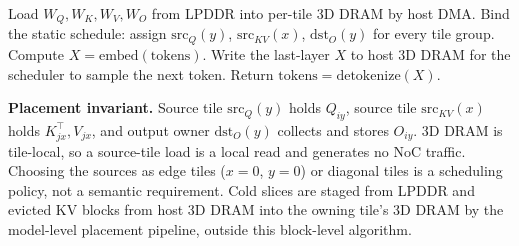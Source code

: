 \documentclass[11pt]{article}
\newcommand{\srcQ}{\mathrm{src}_{Q}}
\newcommand{\srcKV}{\mathrm{src}_{KV}}
\newcommand{\dstO}{\mathrm{dst}_{O}}
\begin{document}
\setcounter{algocf}{-1}
\begin{algorithm}[H]
\DontPrintSemicolon
{}
\caption{Model-level execution flow on the tile array}
Load $W_Q, W_K, W_V, W_O$ from LPDDR into per-tile 3D DRAM by host DMA. 
Bind the static schedule: assign $\srcQ(y)$, $\srcKV(x)$, $\dstO(y)$ for every tile group. 
Compute $X = \mathrm{embed}(\mathrm{tokens})$.\;
Write the last-layer $X$ to host 3D DRAM for the scheduler to sample the next token. 
Return $\mathrm{tokens} = \mathrm{detokenize}(X)$.\;
\end{algorithm}

\noindent\textbf{Placement invariant.} Source tile $\srcQ(y)$ holds $Q_{iy}$, source tile
$\srcKV(x)$ holds $K^\top_{jx}, V_{jx}$, and output owner $\dstO(y)$ collects and stores
$O_{iy}$. 3D DRAM is tile-local, so a source-tile load is a local read and generates no NoC
traffic. Choosing the sources as edge tiles ($x{=}0$, $y{=}0$) or diagonal tiles is a
scheduling policy, not a semantic requirement. Cold slices are staged from LPDDR and evicted
KV blocks from host 3D DRAM into the owning tile's 3D DRAM by the model-level placement
pipeline, outside this block-level algorithm.
\end{document}
